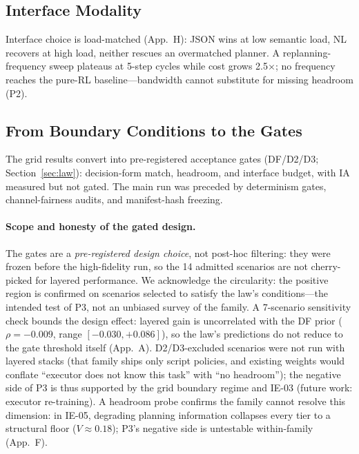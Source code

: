 \documentclass[sigconf,anonymous]{aamas}
\newcommand{\sapp}[1]{App.~#1}
\begin{document}
\subsection{Interface Modality}\label{sec:interface}

Interface choice is load-matched (\sapp{H}): JSON wins at low semantic load, NL recovers at high load, neither rescues an overmatched planner. A replanning-frequency sweep plateaus at 5-step cycles while cost grows 2.5$\times$; no frequency reaches the pure-RL baseline---bandwidth cannot substitute for missing headroom (P2).

\subsection{From Boundary Conditions to the Gates}\label{sec:hifi}

The grid results convert into pre-registered acceptance gates (DF/D2/D3; Section~\ref{sec:law}): decision-form match, headroom, and interface budget, with IA measured but not gated. The main run was preceded by determinism gates, channel-fairness audits, and manifest-hash freezing.

\paragraph{Scope and honesty of the gated design.}
The gates are a \emph{pre-registered design choice}, not post-hoc filtering: they were frozen before the high-fidelity run, so the 14 admitted scenarios are not cherry-picked for layered performance. We acknowledge the circularity: the positive region is confirmed on scenarios selected to satisfy the law's conditions---the intended test of P3, not an unbiased survey of the family. A 7-scenario sensitivity check bounds the design effect: layered gain is uncorrelated with the DF prior ($\rho=-0.009$, range $[-0.030,+0.086]$), so the law's predictions do not reduce to the gate threshold itself (\sapp{A}). D2/D3-excluded scenarios were not run with layered stacks (that family ships only script policies, and existing weights would conflate ``executor does not know this task'' with ``no headroom''); the negative side of P3 is thus supported by the grid boundary regime and IE-03 (future work: executor re-training). A headroom probe confirms the family cannot resolve this dimension: in IE-05, degrading planning information collapses every tier to a structural floor ($V \approx 0.18$); P3's negative side is untestable within-family (\sapp{F}).
\end{document}
